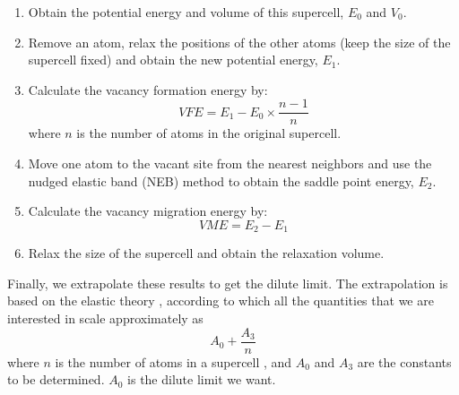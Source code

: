 \documentclass[%
 reprint,
 amsmath,amssymb,
 aps,
]{revtex4-1}
\begin{document}
\begin{enumerate}
 \item Obtain the potential energy and volume of this supercell, $E_0$ and $V_0$.
 \item Remove an atom, relax the positions of the other atoms (keep the size of the supercell fixed) and obtain the new potential energy, $E_1$.
 \item Calculate the vacancy formation energy by:
 \begin{equation}
 \label{eq:vfecalc}
 \mathit{VFE} = E_1 - E_0 \times \frac{n - 1}{n}
 \end{equation}
 where $n$ is the number of atoms in the original supercell.
 \item Move one atom to the vacant site from the nearest neighbors and use the nudged elastic band (NEB) method to obtain the saddle point energy, $E_2$.
 \item Calculate the vacancy migration energy by:
 \begin{equation}
 \label{eq:vmecalc}
 \mathit{VME} = E_2 - E_1
 \end{equation}
 \item Relax the size of the supercell and obtain the relaxation volume.
\end{enumerate}

Finally, we extrapolate these results to get the dilute limit.
The extrapolation is based on the elastic theory \cite{landau2013course}, according to which all the quantities that we are interested in scale approximately as
\begin{equation}
\label{eq:extrapolation}
A_0 + \frac{A_3}{n}
\end{equation}
where $n$ is the number of atoms in a supercell \cite{freysoldt2014first}, and $A_0$ and $A_3$ are the constants to be determined.
$A_0$ is the dilute limit we want.
\end{document}
